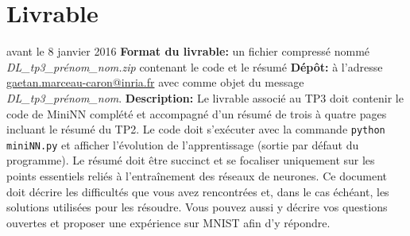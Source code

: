 \documentclass{article}
\begin{document}
\section{Livrable}
 avant le 8 janvier 2016 \newline
{\bf Format du livrable:} un fichier compressé nommé {\it DL\_tp3\_prénom\_nom.zip} contenant le code et le résumé \newline
{\bf Dépôt:} à l'adresse \url{gaetan.marceau-caron@inria.fr} avec comme objet du message {\it DL\_tp3\_prénom\_nom}.\newline
{\bf Description:}\newline
Le livrable associé au TP3 doit contenir le code de MiniNN complété et accompagné d'un résumé de trois à quatre pages incluant le résumé du TP2.
Le code doit s'exécuter avec la commande \texttt{python miniNN.py} et afficher l'évolution de l'apprentissage (sortie par défaut du programme).
Le résumé doit être succinct et se focaliser uniquement sur les points essentiels reliés à l'entraînement des réseaux de neurones.
Ce document doit décrire les difficultés que vous avez rencontrées et, dans le cas échéant, les solutions utilisées pour les résoudre.
Vous pouvez aussi y décrire vos questions ouvertes et proposer une expérience sur MNIST afin d'y répondre.     

\printbibliography
\end{document}
